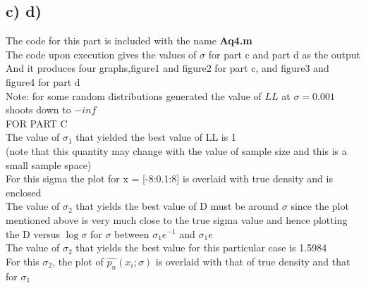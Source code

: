 \documentclass{article}
\begin{document}
\subsection*{c) d)}
The code for this part is included with the name \textbf{Aq4.m}\\
The code upon execution gives the values of $\sigma$ for part c and part d as the output\\
And it produces four graphs,figure1 and figure2 for part c, and figure3 and figure4 for part d\\
Note: for some random distributions generated the value of $LL$ at $\sigma = 0.001$ shoots down to $-inf$\\
FOR PART C\\
The value of $\sigma_1$ that yielded the best value of LL is 1 \\
(note that this quantity may change with the value of sample size and this is a small sample space)\\
For this sigma the plot for x = [-8:0.1:8] is overlaid with true density and is enclosed\\
The value of $\sigma_2$ that yields the best value of D must be around $\sigma$ since the plot mentioned above is very much close to the true sigma value and hence plotting the D versus $\log \sigma$ for $\sigma$ between $\sigma_1e^{-1}$ and $\sigma_1e$\\
The value of $\sigma_2$ that yields the best value for this particular case is 1.5984\\
For this $\sigma_2$, the plot of $\hat{p_n}(x_i;\sigma)$ is overlaid with that of true density and that for $\sigma_1$
\end{document}

